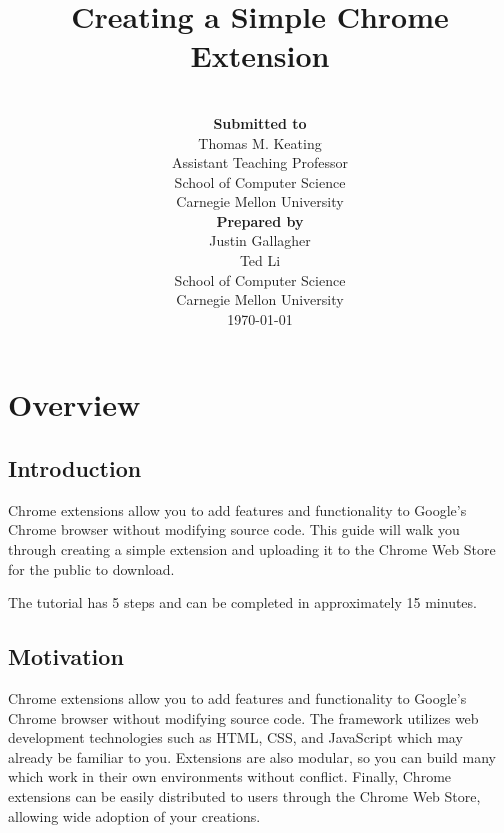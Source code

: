 \documentclass[11pt]{article}
\title{Creating a Simple Chrome Extension\\ \vspace*{.5em} \Large\mytitle}
\date{}
\newcommand{\myname}{Justin Gallagher, Ted Li}
\begin{document}
\author{~\\
\normalsize {\bf Submitted to}\\
\normalsize Thomas M. Keating\\
\normalsize Assistant Teaching Professor\\
\normalsize School of Computer Science\\
\normalsize Carnegie Mellon University\vspace*{2em}\\
\normalsize {\bf Prepared by}\\
\normalsize Justin Gallagher\\
\normalsize Ted Li\vspace*{2em}\\
\normalsize School of Computer Science\\
\normalsize Carnegie Mellon University\\
\normalsize \today}

\clearpage\maketitle
\thispagestyle{firststyle}

\newpage
\lhead{\myname}
\rhead{\thepage}
\setlength{\headsep}{25pt}
\tableofcontents
\newpage
{} 
\setlength{\voffset}{-50pt}
\setlength{\headsep}{25pt}

\section{Overview}

\subsection{Introduction}

Chrome extensions allow you to add features and functionality to Google's Chrome browser without modifying source code. This guide will walk you through creating a simple extension and uploading it to the Chrome Web Store for the public to download.

The tutorial has 5 steps and can be completed in approximately 15 minutes.

\subsection{Motivation}

Chrome extensions allow you to add features and functionality to Google's Chrome browser without modifying source code. The framework utilizes web development technologies such as HTML, CSS, and JavaScript which may already be familiar to you. Extensions are also modular, so you can build many which work in their own environments without conflict. Finally, Chrome extensions can be easily distributed to users through the Chrome Web Store, allowing wide adoption of your creations.
\end{document}
